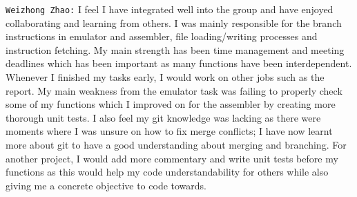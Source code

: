 \documentclass[11pt]{article}
\begin{document}
\texttt{Weizhong Zhao:} I feel I have integrated well into the group and have enjoyed collaborating and learning from others. I was mainly responsible for the branch instructions in emulator and assembler, file loading/writing processes and instruction fetching. My main strength has been time management and meeting deadlines which has been important as many functions have been interdependent. Whenever I finished my tasks early, I would work on other jobs such as the report. My main weakness from the emulator task was failing to properly check some of my functions which I improved on for the assembler by creating more thorough unit tests. I also feel my git knowledge was lacking as there were moments where I was unsure on how to fix merge conflicts; I have now learnt more about git to have a good understanding about merging and branching. For another project, I would add more commentary and write unit tests before my functions as this would help my code understandability for others while also giving me a concrete objective to code towards.
\end{document}
